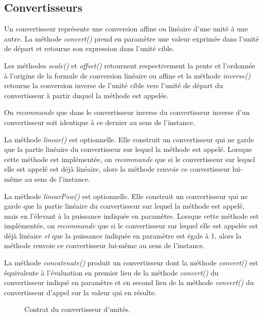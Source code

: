 \documentclass[a4paper,draft,twoside,10pt]{article}
\begin{document}
\subsection{Convertisseurs}

Un convertisseur représente une conversion affine ou linéaire d'une unité à une autre. La méthode \emph{convert()} prend
en paramètre une valeur exprimée dans l'unité de départ et retourne son expression dans l'unité cible.

Les méthodes \emph{scale()} et \emph{offset()} retournent respectivement la pente et l'ordonnée à l'origine de la
formule de conversion linéaire ou affine et la méthode \emph{inverse()} retourne la conversion inverse de l'unité cible
vers l'unité de départ du convertisseur à partir duquel la méthode est appelée.

On \emph{recommande} que dans le convertisseur inverse du convertisseur inverse d'un convertisseur soit identique à ce
dernier au sens de l'instance.

La méthode \emph{linear()} est optionnelle. Elle construit un convertisseur qui ne garde que la partie linéaire du
convertisseur sur lequel la méthode est appelé. Lorsque cette méthode est implémentée, on \emph{recommande} que si le
convertisseur sur lequel elle est appelé est déjà linéaire, alors la méthode renvoie ce convertisseur lui-même au sens
de l'instance.

La méthode \emph{linearPow()} est optionnelle. Elle construit un convertisseur qui ne garde que la partie linéaire du
convertisseur sur lequel la méthode est appelé, mais en l'élevant à la puissance indiquée en paramètre. Lorsque cette
méthode est implémentée, on \emph{recommande} que si le convertisseur sur lequel elle est appelée est déjà linéaire
\emph{et} que la puissance indiquée en paramètre est égale à 1, alors la méthode renvoie ce convertisseur lui-même au
sens de l'instance.

La méthode \emph{concatenate()} produit un convertisseur dont la méthode \emph{convert()} est équivalente à l'évaluation
en premier lieu de la méthode \emph{convert()} du convertisseur indiqué en paramètre et en second lieu de la méthode
\emph{convert()} du convertisseur d'appel sur la valeur qui en résulte.

\begin{figure}[!h]
\caption{Contrat du convertisseur d'unités.}
\end{figure}
\end{document}

